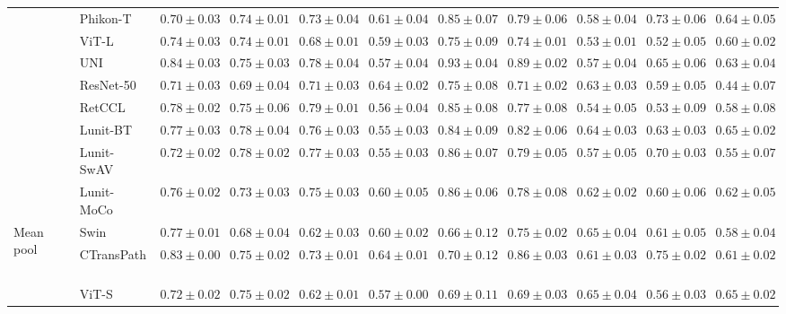 \begin{tabular}{ll|cccc|c|cccc}
 & Phikon-T~\cite{filiot2023scaling} & $0.70 \pm 0.03$ & $0.74 \pm 0.01$ & $0.73 \pm 0.04$ & $0.61 \pm 0.04$ & $0.85 \pm 0.07$ & $0.79 \pm 0.06$ & $0.58 \pm 0.04$ & $0.73 \pm 0.06$ & $0.64 \pm 0.05$ \\
 & ViT-L~\cite{kolesnikov2021image} & $0.74 \pm 0.03$ & $0.74 \pm 0.01$ & $0.68 \pm 0.01$ & $0.59 \pm 0.03$ & $0.75 \pm 0.09$ & $0.74 \pm 0.01$ & $0.53 \pm 0.01$ & $0.52 \pm 0.05$ & $0.60 \pm 0.02$ \\
 & UNI~\cite{chen2024uni} & $\mathbf{0.84 \pm 0.03}$ & $0.75 \pm 0.03$ & $0.78 \pm 0.04$ & $0.57 \pm 0.04$ & $\mathbf{0.93 \pm 0.04}$ & $\mathbf{0.89 \pm 0.02}$ & $0.57 \pm 0.04$ & $0.65 \pm 0.06$ & $0.63 \pm 0.04$ \\
 & ResNet-50~\cite{he2015deep} & $0.71 \pm 0.03$ & $0.69 \pm 0.04$ & $0.71 \pm 0.03$ & $\mathbf{0.64 \pm 0.02}$ & $0.75 \pm 0.08$ & $0.71 \pm 0.02$ & $0.63 \pm 0.03$ & $0.59 \pm 0.05$ & $0.44 \pm 0.07$ \\
 & RetCCL~\cite{wang2023retccl} & $0.78 \pm 0.02$ & $0.75 \pm 0.06$ & $\mathbf{0.79 \pm 0.01}$ & $0.56 \pm 0.04$ & $0.85 \pm 0.08$ & $0.77 \pm 0.08$ & $0.54 \pm 0.05$ & $0.53 \pm 0.09$ & $0.58 \pm 0.08$ \\
 & Lunit-BT~\cite{kang2023benchmarking} & $0.77 \pm 0.03$ & $0.78 \pm 0.04$ & $0.76 \pm 0.03$ & $0.55 \pm 0.03$ & $0.84 \pm 0.09$ & $0.82 \pm 0.06$ & $\mathbf{0.64 \pm 0.03}$ & $0.63 \pm 0.03$ & $0.65 \pm 0.02$ \\
 & Lunit-SwAV~\cite{kang2023benchmarking} & $0.72 \pm 0.02$ & $\mathbf{0.78 \pm 0.02}$ & $0.77 \pm 0.03$ & $0.55 \pm 0.03$ & $0.86 \pm 0.07$ & $0.79 \pm 0.05$ & $0.57 \pm 0.05$ & $0.70 \pm 0.03$ & $0.55 \pm 0.07$ \\
 & Lunit-MoCo~\cite{kang2023benchmarking} & $0.76 \pm 0.02$ & $0.73 \pm 0.03$ & $0.75 \pm 0.03$ & $0.60 \pm 0.05$ & $0.86 \pm 0.06$ & $0.78 \pm 0.08$ & $0.62 \pm 0.02$ & $0.60 \pm 0.06$ & $0.62 \pm 0.05$ \\
\cline{1-11}
\multirow[t]{14}{*}{Mean pool} & Swin~\cite{liu2021swin} & $0.77 \pm 0.01$ & $0.68 \pm 0.04$ & $0.62 \pm 0.03$ & $0.60 \pm 0.02$ & $0.66 \pm 0.12$ & $0.75 \pm 0.02$ & $0.65 \pm 0.04$ & $0.61 \pm 0.05$ & $0.58 \pm 0.04$ \\
 & CTransPath~\cite{wang2022transformer} & $0.83 \pm 0.00$ & $0.75 \pm 0.02$ & $0.73 \pm 0.01$ & $\mathbf{0.64 \pm 0.01}$ & $0.70 \pm 0.12$ & $0.86 \pm 0.03$ & $0.61 \pm 0.03$ & $0.75 \pm 0.02$ & $0.61 \pm 0.02$ \\
 & ViT-S~\cite{kolesnikov2021image} & $0.72 \pm 0.02$ & $0.75 \pm 0.02$ & $0.62 \pm 0.01$ & $0.57 \pm 0.00$ & $0.69 \pm 0.11$ & $0.69 \pm 0.03$ & $0.65 \pm 0.04$ & $0.56 \pm 0.03$ & $0.65 \pm 0.02$ \\

\end{tabular}
